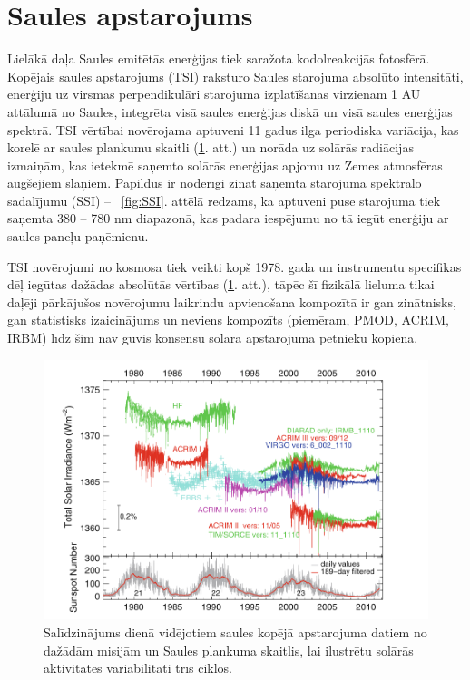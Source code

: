 \section{Saules apstarojums}

Lielākā daļa Saules emitētās enerģijas tiek saražota kodolreakcijās fotosfērā. 
Kopējais saules apstarojums (TSI) raksturo Saules starojuma absolūto intensitāti,
enerģiju uz virsmas perpendikulāri starojuma izplatīšanas virzienam 1 AU attālumā no Saules, integrēta visā saules enerģijas diskā un visā saules enerģijas spektrā. \cite{ThermalProcesses} TSI vērtībai novērojama aptuveni 11 gadus ilga periodiska variācija, kas korelē ar saules plankumu skaitli (\ref{fig:TSI_misijas}. att.)  un norāda uz solārās radiācijas izmaiņām, kas ietekmē saņemto solārās enerģijas apjomu uz Zemes atmosfēras augšējiem slāņiem. Papildus ir noderīgi zināt saņemtā starojuma spektrālo sadalījumu (SSI) -- ~\ref{fig:SSI}. attēlā redzams, ka aptuveni puse starojuma tiek saņemta 380 -- 780 nm diapazonā, kas padara iespējumu no tā iegūt enerģiju ar saules paneļu paņēmienu.

TSI novērojumi no kosmosa tiek veikti kopš 1978. gada un instrumentu specifikas dēļ iegūtas dažādas absolūtās vērtības (\ref{fig:TSI_misijas}. att.), tāpēc šī fizikālā lieluma tikai daļēji pārkājušos novērojumu laikrindu apvienošana kompozītā ir gan zinātnisks, gan statistisks izaicinājums un neviens kompozīts (piemēram, PMOD, ACRIM, IRBM) līdz šim nav guvis konsensu solārā apstarojuma pētnieku kopienā.

\begin{figure}[h]
    \centering
    \includegraphics[width=0.6\linewidth]{figures/misc/TSI_misijas.png}
    \caption{Salīdzinājums dienā vidējotiem saules kopējā apstarojuma datiem no dažādām misijām un Saules plankuma skaitlis, lai ilustrētu solārās aktivitātes variabilitāti trīs ciklos. \cite{Frohlich2012}}
    \label{fig:TSI_misijas}
\end{figure}

